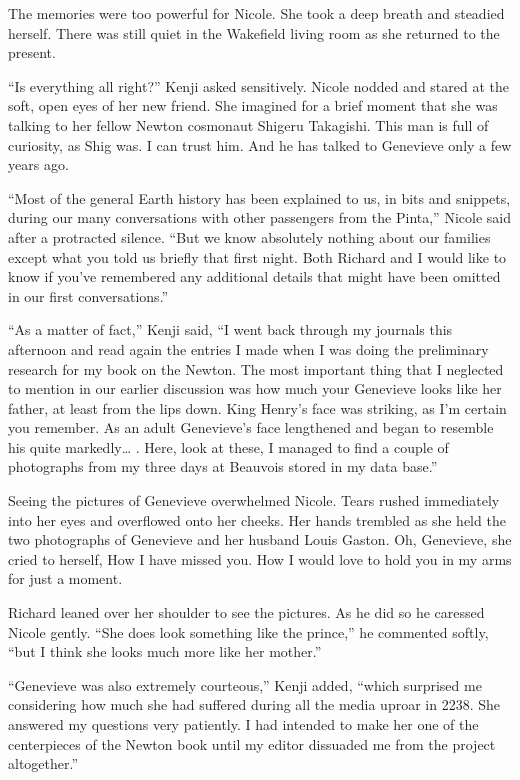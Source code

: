 \documentclass[]{article}
\begin{document}
{The memories were too powerful for Nicole. She took a deep breath and steadied herself. There was still quiet in the Wakefield living room as she returned to the present.

“Is everything all right?” Kenji asked sensitively. Nicole nodded and stared at the soft, open eyes of her new friend. She imagined for a brief moment that she was talking to her fellow Newton cosmonaut Shigeru Takagishi. This man is full of curiosity, as Shig was. I can trust him. And he has talked to Genevieve only a few years ago.

“Most of the general Earth history has been explained to us, in bits and snippets, during our many conversations with other passengers from the Pinta,” Nicole said after a protracted silence. “But we know absolutely nothing about our families except what you told us briefly that first night. Both Richard and I would like to know if you’ve remembered any additional details that might have been omitted in our first conversations.”

“As a matter of fact,” Kenji said, “I went back through my journals this afternoon and read again the entries I made when I was doing the preliminary research for my book on the Newton. The most important thing that I neglected to mention in our earlier discussion was how much your Genevieve looks like her father, at least from the lips down. King Henry’s face was striking, as I’m certain you remember. As an adult Genevieve’s face lengthened and began to resemble his quite markedly… . Here, look at these, I managed to find a couple of photographs from my three days at Beauvois stored in my data base.”

Seeing the pictures of Genevieve overwhelmed Nicole. Tears rushed immediately into her eyes and overflowed onto her cheeks. Her hands trembled as she held the two photographs of Genevieve and her husband Louis Gaston. Oh, Genevieve, she cried to herself, How I have missed you. How I would love to hold you in my arms for just a moment.

Richard leaned over her shoulder to see the pictures. As he did so he caressed Nicole gently. “She does look something like the prince,” he commented softly, “but I think she looks much more like her mother.”

“Genevieve was also extremely courteous,” Kenji added, “which surprised me considering how much she had suffered during all the media uproar in 2238. She answered my questions very patiently. I had intended to make her one of the centerpieces of the Newton book until my editor dissuaded me from the project altogether.”

}
\end{document}
